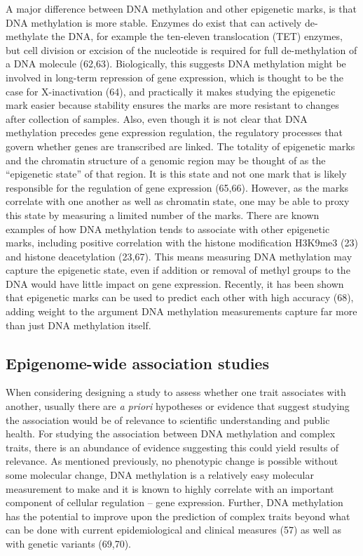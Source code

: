 \documentclass[11pt,oneside]{bristolthesis}
\begin{document}
A major difference between DNA methylation and other epigenetic marks, is that DNA methylation is more stable. Enzymes do exist that can actively de-methylate the DNA, for example the ten-eleven translocation (TET) enzymes, but cell division or excision of the nucleotide is required for full de-methylation of a DNA molecule (62,63). Biologically, this suggests DNA methylation might be involved in long-term repression of gene expression, which is thought to be the case for X-inactivation (64), and practically it makes studying the epigenetic mark easier because stability ensures the marks are more resistant to changes after collection of samples. Also, even though it is not clear that DNA methylation precedes gene expression regulation, the regulatory processes that govern whether genes are transcribed are linked. The totality of epigenetic marks and the chromatin structure of a genomic region may be thought of as the ``epigenetic state'' of that region. It is this state and not one mark that is likely responsible for the regulation of gene expression (65,66). However, as the marks correlate with one another as well as chromatin state, one may be able to proxy this state by measuring a limited number of the marks. There are known examples of how DNA methylation tends to associate with other epigenetic marks, including positive correlation with the histone modification H3K9me3 (23) and histone deacetylation (23,67). This means measuring DNA methylation may capture the epigenetic state, even if addition or removal of methyl groups to the DNA would have little impact on gene expression. Recently, it has been shown that epigenetic marks can be used to predict each other with high accuracy (68), adding weight to the argument DNA methylation measurements capture far more than just DNA methylation itself.

\hypertarget{ewas}{%
\subsection{Epigenome-wide association studies}\label{ewas}}

When considering designing a study to assess whether one trait associates with another, usually there are \emph{a priori} hypotheses or evidence that suggest studying the association would be of relevance to scientific understanding and public health. For studying the association between DNA methylation and complex traits, there is an abundance of evidence suggesting this could yield results of relevance. As mentioned previously, no phenotypic change is possible without some molecular change, DNA methylation is a relatively easy molecular measurement to make and it is known to highly correlate with an important component of cellular regulation -- gene expression. Further, DNA methylation has the potential to improve upon the prediction of complex traits beyond what can be done with current epidemiological and clinical measures (57) as well as with genetic variants (69,70).
\end{document}
